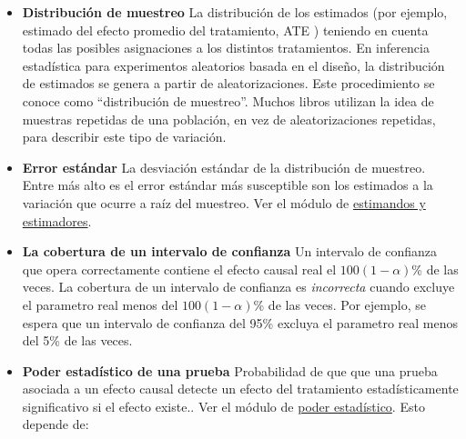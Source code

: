 \documentclass[
  12pt,
  spanish,
]{book}
\begin{document}
\begin{itemize}
\item
  \textbf{Distribución de muestreo} La distribución de los estimados (por ejemplo, estimado del efecto promedio del tratamiento, ATE ) teniendo en cuenta todas las posibles asignaciones a los distintos tratamientos. En inferencia estadística para experimentos aleatorios basada en el diseño, la distribución de estimados se genera a partir de aleatorizaciones. Este procedimiento se conoce como ``distribución de muestreo''. Muchos libros utilizan la idea de muestras repetidas de una población, en vez de aleatorizaciones repetidas, para describir este tipo de variación.
\item
  \textbf{Error estándar} La desviación estándar de la distribución de muestreo. Entre más alto es el error estándar más susceptible son los estimados a la variación que ocurre a raíz del muestreo. Ver el módulo de \href{estimandos-y-estimadores.html}{estimandos y estimadores}.
\item
  \textbf{La cobertura de un intervalo de confianza} Un intervalo de confianza que opera correctamente contiene el efecto causal real el \(100 ( 1 - \alpha)\)\% de las veces. La cobertura de un intervalo de confianza es \emph{incorrecta} cuando excluye el parametro real menos del \(100 (1 - \alpha)\)\% de las veces. Por ejemplo, se espera que un intervalo de confianza del 95\% excluya el parametro real menos del
  5\% de las veces.
\item
  \textbf{Poder estadístico de una prueba} Probabilidad de que que una prueba asociada a un efecto causal detecte un efecto del tratamiento estadísticamente significativo si el efecto existe.. Ver el módulo de \href{poder-estadístico-y-diagnosticandos-del-diseño.html}{poder estadístico}. Esto depende de:


\end{itemize}
\end{document}
